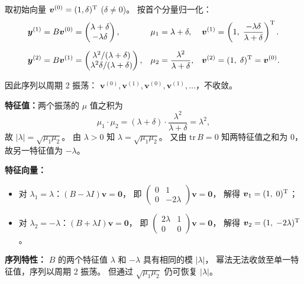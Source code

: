 \documentclass{article}
\begin{document}
\begin{solution}
  取初始向量 $\boldsymbol{v}^{(0)} = (1, \delta)^{\mathrm{T}}$ ($\delta \neq 0$)。
  按首个分量归一化：
  \begin{align*}
    \boldsymbol{y}^{(1)} &= B\boldsymbol{v}^{(0)}
    =
    \begin{pmatrix} \lambda + \delta \\ -\lambda\delta
    \end{pmatrix},
    &\mu_1 &= \lambda + \delta,
    &\boldsymbol{v}^{(1)} &= \left(1,\;
    \frac{-\lambda\delta}{\lambda+\delta}\right)^{\mathrm{T}}. \\[6pt]
    \boldsymbol{y}^{(2)} &= B\boldsymbol{v}^{(1)}
    =
    \begin{pmatrix} \lambda^2/(\lambda+\delta)
      \\ \lambda^2\delta/(\lambda+\delta)
    \end{pmatrix},
    &\mu_2 &= \frac{\lambda^2}{\lambda+\delta},
    &\boldsymbol{v}^{(2)} &= (1,\; \delta)^{\mathrm{T}} = \boldsymbol{v}^{(0)}.
  \end{align*}

  因此序列以周期 2 振荡：
  $\boldsymbol{v}^{(0)}, \boldsymbol{v}^{(1)}, \boldsymbol{v}^{(0)},
  \boldsymbol{v}^{(1)}, \ldots$，不收敛。

  \textbf{特征值：}两个振荡的 $\mu$ 值之积为
  \[
    \mu_1 \cdot \mu_2 = (\lambda+\delta) \cdot
    \frac{\lambda^2}{\lambda+\delta} = \lambda^2,
  \]
  故 $|\lambda| = \sqrt{\mu_1\mu_2}$。
  由 $\lambda > 0$ 知 $\lambda = \sqrt{\mu_1\mu_2}$。
  又由 $\mathrm{tr}\, B = 0$ 知两特征值之和为 0，故另一特征值为 $-\lambda$。

  \textbf{特征向量：}
  \begin{itemize}
    \item 对 $\lambda_1 = \lambda$：$(B - \lambda I)\boldsymbol{v} =
      \boldsymbol{0}$，
      即 $
      \begin{pmatrix} 0 & 1 \\ 0 & -2\lambda
      \end{pmatrix}\boldsymbol{v} = \boldsymbol{0}$，
      解得 $\boldsymbol{v}_1 = (1,\; 0)^{\mathrm{T}}$；
    \item 对 $\lambda_2 = -\lambda$：$(B + \lambda I)\boldsymbol{v} =
      \boldsymbol{0}$，
      即 $
      \begin{pmatrix} 2\lambda & 1 \\ 0 & 0
      \end{pmatrix}\boldsymbol{v} = \boldsymbol{0}$，
      解得 $\boldsymbol{v}_2 = (1,\; -2\lambda)^{\mathrm{T}}$。
  \end{itemize}

  \textbf{序列特性：}
  $B$ 的两个特征值 $\lambda$ 和 $-\lambda$ 具有相同的模 $|\lambda|$，
  幂法无法收敛至单一特征值，序列以周期 2 振荡。
  但通过 $\sqrt{\mu_1\mu_2}$ 仍可恢复 $|\lambda|$。

\end{solution}
\end{document}
